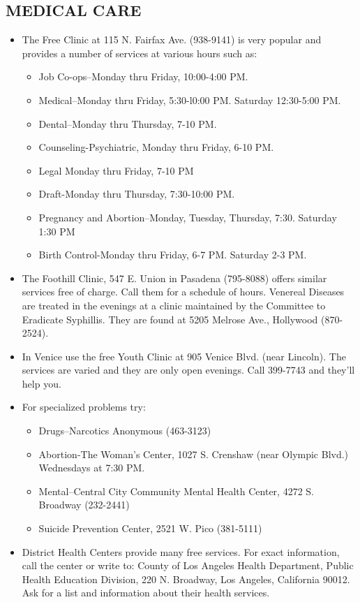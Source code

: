 \documentclass[11pt,twoside,a4paper]{book}
\begin{document}
\subsection{MEDICAL CARE}
\begin{itemize}
	\item The Free Clinic at 115 N. Fairfax Ave. (938-9141) is very popular and provides a number of services at various hours such as:	
	\begin{itemize}
		\item Job Co-ops--Monday thru Friday, 10:00-4:00 PM.     
		\item Medical--Monday thru Friday, 5:30-l0:00 PM. Saturday 12:30-5:00 PM. 
		\item Dental--Monday thru Thursday, 7-10 PM.     
		\item Counseling-Psychiatric, Monday thru Friday, 6-10 PM.     
		\item Legal Monday thru Friday, 7-10 PM     
		\item Draft-Monday thru Thursday, 7:30-10:00 PM.     
		\item Pregnancy and Abortion--Monday, Tuesday, Thursday, 7:30. Saturday 1:30 PM     
		\item Birth Control-Monday thru Friday, 6-7 PM. Saturday 2-3 PM.
	\end{itemize}
	\item The Foothill Clinic, 547 E. Union in Pasadena (795-8088) offers similar services free of charge. Call them for a schedule of hours. Venereal Diseases are treated in the evenings at a clinic maintained by the Committee to Eradicate 	Syphillis. They are found at 5205 Melrose Ave., Hollywood (870-2524). 
	\item In Venice use the free Youth Clinic at 905 Venice Blvd. (near Lincoln). The services are varied and they are only open evenings. Call 399-7743 and they'll help you. 
	\item For specialized problems try:
	\begin{itemize}
		\item Drugs--Narcotics Anonymous (463-3123)     
		\item Abortion-The Woman's Center, 1027 S. Crenshaw (near Olympic Blvd.) Wednesdays at 7:30 PM.     
		\item Mental--Central City Community Mental Health Center, 4272 S. Broadway (232-2441)     
		\item Suicide Prevention Center, 2521 W. Pico (381-5111)
	\end{itemize}
	\item District Health Centers provide many free services. For exact information, call the center or write to: County of Los Angeles Health Department, Public Health Education Division, 220 N. Broadway, Los Angeles, California 90012. Ask for a list and information about their health services.	       

\end{itemize}
\end{document}
